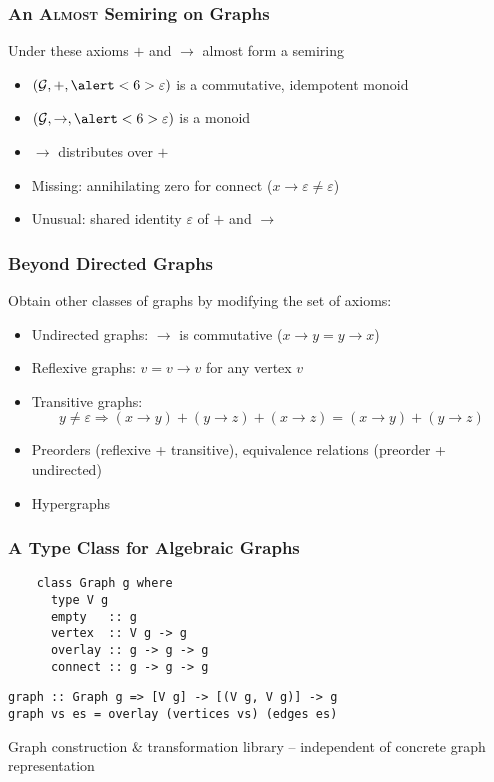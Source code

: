 \documentclass{beamer}
\renewcommand{\epsilon}{\varepsilon}
\newcommand{\eps}{\epsilon}
\newcommand{\connect}{\rightarrow}
\begin{document}
\begin{frame}
  \frametitle{An \textsc{Almost} Semiring on Graphs}
  \onslide<+->
  \begin{alertblock}{Under these axioms $+$ and $\connect$ almost form a
      semiring}
    \begin{itemize}[<+->]
    \item $(\mathcal{G}, +, \alert<6>{\eps})$ is a commutative, idempotent monoid
    \item $(\mathcal{G}, \connect, \alert<6>{\eps})$ is a monoid
    \item $\connect$ distributes over $+$
    \end{itemize}    
  \end{alertblock}

  \begin{itemize}[<+->]
  \item Missing: annihilating zero for connect ($x \connect \eps \neq \eps$)
  \item Unusual: shared identity \alert{$\eps$} of $+$ and $\connect$
  \end{itemize}
\end{frame}

\begin{frame}
  \frametitle{Beyond Directed Graphs}
  \onslide<+->
  \begin{alertblock}{Obtain other classes of graphs by modifying the set of
      axioms:}
    \begin{itemize}[<+->]
    \item Undirected graphs: $\connect$ is commutative ($x
      \connect y = y \connect x$)
    \item Reflexive graphs: $v = v \connect v$ for any vertex $v$
    \item Transitive graphs:
      \[
        y \neq \eps \Rightarrow (x \connect y) + (y \connect z) + (x \connect z) = (x
        \connect y) + (y \connect z)
      \]
    \item Preorders (reflexive + transitive), equivalence relations (preorder +
      undirected)
    \item Hypergraphs
    \end{itemize}
  \end{alertblock}
\end{frame}

\begin{frame}[fragile]
  \frametitle{A Type Class for Algebraic Graphs}
  \onslide<+->
  \begin{verbatim}
    class Graph g where
      type V g
      empty   :: g
      vertex  :: V g -> g
      overlay :: g -> g -> g
      connect :: g -> g -> g
  \end{verbatim}
  \onslide<+->
  \begin{verbatim}
graph :: Graph g => [V g] -> [(V g, V g)] -> g
graph vs es = overlay (vertices vs) (edges es)
  \end{verbatim}
  \onslide<+->
  \alert{\textrightarrow{} Graph construction \& transformation library --
    independent of concrete graph representation}
\end{frame}
\end{document}
